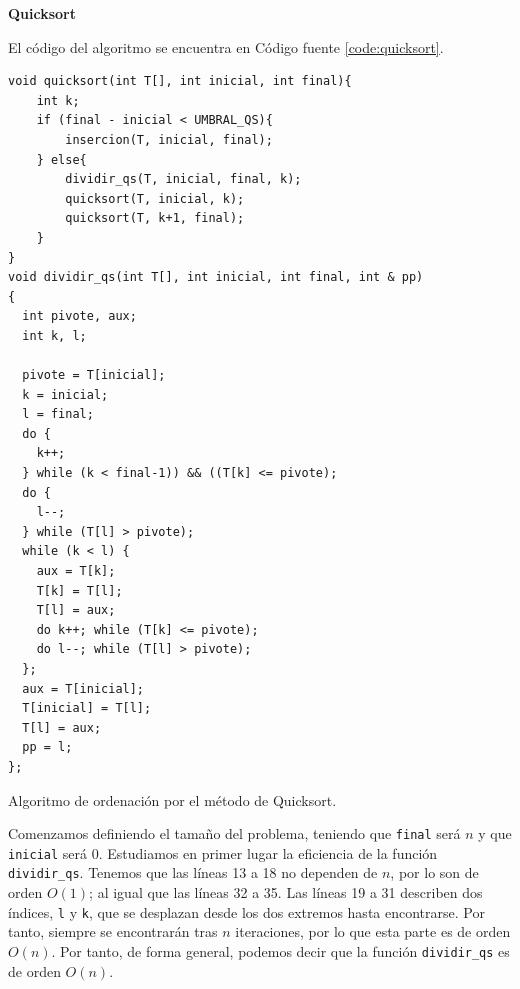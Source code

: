 \documentclass[12pt]{article}
\begin{document}
    \textbf{Quicksort}

    El código del algoritmo se encuentra en Código fuente \ref{code:quicksort}.
    
    \begin{listing}
        \begin{verbatim}
void quicksort(int T[], int inicial, int final){
    int k;
    if (final - inicial < UMBRAL_QS){
        insercion(T, inicial, final);
    } else{
        dividir_qs(T, inicial, final, k);
        quicksort(T, inicial, k);
        quicksort(T, k+1, final);
    }
}
void dividir_qs(int T[], int inicial, int final, int & pp)
{
  int pivote, aux;
  int k, l;

  pivote = T[inicial];
  k = inicial;
  l = final;
  do {
    k++;
  } while (k < final-1)) && ((T[k] <= pivote);
  do {
    l--;
  } while (T[l] > pivote);
  while (k < l) {
    aux = T[k];
    T[k] = T[l];
    T[l] = aux;
    do k++; while (T[k] <= pivote);
    do l--; while (T[l] > pivote);
  };
  aux = T[inicial];
  T[inicial] = T[l];
  T[l] = aux;
  pp = l;
};

        \end{verbatim}
        \caption{Algoritmo de ordenación por el método de Quicksort.}
        \label{code:quicksort}
    \end{listing}
    Comenzamos definiendo el tamaño del problema, teniendo que \verb|final| será $n$ y que \verb|inicial| será $0$. Estudiamos en primer lugar la eficiencia de la función \verb|dividir_qs|. Tenemos que las líneas 13 a 18 no dependen de $n$, por lo son de orden $O(1)$; al igual que las líneas 32 a 35. Las líneas 19 a 31 describen dos índices, \verb|l| y \verb|k|, que se desplazan desde los dos extremos hasta encontrarse. Por tanto, siempre se encontrarán tras $n$ iteraciones, por lo que esta parte es de orden $O(n)$. Por tanto, de forma general, podemos decir que la función \verb|dividir_qs| es de orden $O(n)$.
    
\end{document}
